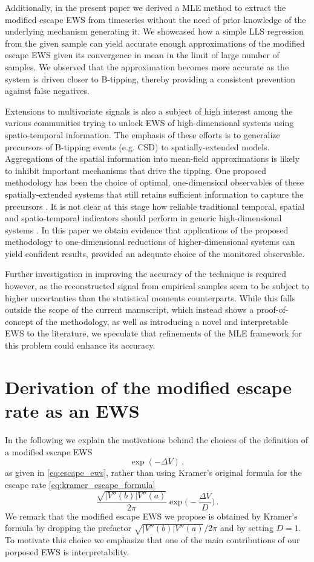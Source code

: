 \documentclass[a4paper,fleqn]{cas-sc}
\begin{document}
Additionally, in the present paper we derived a MLE method to extract the modified escape EWS from timeseries without the need of prior knowledge of the underlying mechanism generating it.
We showcased how a simple LLS regression from the given sample can yield accurate enough approximations of the modified escape EWS given its convergence in mean in the limit of large number of samples.
We observed that the approximation becomes more accurate as the system is driven closer to B-tipping, thereby providing a consistent prevention against false negatives.

Extensions to multivariate signals is also a subject of high interest among the various communities trying to unlock EWS of high-dimensional systems using spatio-temporal information.
The emphasis of these efforts is to generalize precursors of B-tipping events (e.g. CSD) to spatially-extended models.
        Aggregations of the spatial information into mean-field approximations is likely to inhibit important mechanisms that drive the tipping.
        One proposed methodology has been the choice of optimal, one-dimensioal observables of these spatially-extended systems that still retains sufficient information to capture the precursors \cite{Lohmann2025b}.
        It is not clear at this stage how reliable traditional temporal, spatial and spatio-temporal indicators should perform in generic high-dimensional systems \cite{Robinson2025}.
In this paper we obtain evidence that applications of the proposed methodology to one-dimensional reductions of higher-dimensional systems can yield confident results, provided an adequate choice of the monitored observable.

Further investigation in improving the accuracy of the technique is required however, as the reconstructed signal from empirical samples seem to be subject to higher uncertanties than the statistical moments counterparts.
While this falls outside the scope of the current manuscript, which instead shows a proof-of-concept of the methodology, as well as introducing a novel and interpretable EWS to the literature, we speculate that refinements of the MLE framework for this problem could enhance its accuracy.
%
\appendix
%
\section{Derivation of the modified escape rate as an EWS}\label{appendix_a}
In the following we explain the motivations behind the choices of the definition of a modified escape EWS
%
\begin{equation*}
        \exp(-\Delta V)\,,
\end{equation*}
%
as given in \eqref{eq:escape_ews}, rather than using Kramer's original formula for the escape rate \eqref{eq:kramer_escape_formula}
%
\begin{equation*}
        \frac{\sqrt{|V''(b)|V''(a)}}{2\pi}\exp\bigg(-\frac{\Delta V}{D}\bigg)\,.
\end{equation*}
%
We remark that the modified escape EWS we propose is obtained by Kramer's formula by dropping the prefactor $\sqrt{|V''(b)|V''(a)}/2\pi$ and by setting $D=1$.
To motivate this choice we emphasize that one of the main contributions of our porposed EWS is interpretability.
\end{document}
